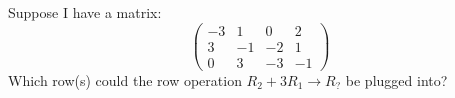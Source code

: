 \documentclass{ximera}
\author{Bart Snapp}
\begin{document}
\begin{exercise}
  Suppose I have a matrix:
  \[
  \begin{pmatrix}
    -3 & 1 & 0 & 2 \\
    3 & -1 & -2 & 1 \\
    0 & 3 & -3 & -1
  \end{pmatrix}
  \]
  Which row(s) could the row operation $R_2+3R_1\to R_?$ be plugged into?
  \begin{prompt}
  \begin{selectAll}
  \end{selectAll}
  \end{prompt}
\end{exercise}
\end{document}
